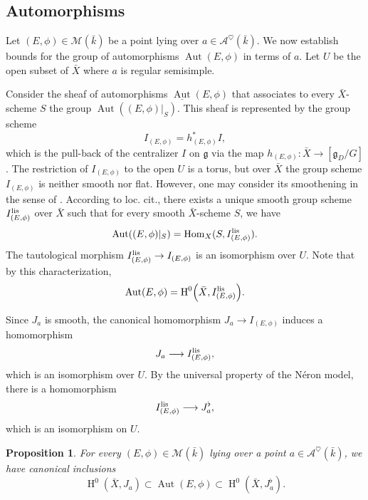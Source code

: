\documentclass[12pt,english]{smfart}
\numberwithin{equation}{subsection}
\newtheorem{proposition}[equation]{Proposition}
\theoremstyle{remark}
\begin{document}
\subsection{Automorphisms}\label{subsection : Automorphismes}

Let $(E,\phi)\in\mathcal{M}(\bar{k})$ be a point lying over $a\in\mathcal{A}^\heartsuit(\bar{k})$.
We now establish bounds for the group of automorphisms $\operatorname{Aut}(E,\phi)$ in terms of $a$.
Let $U$ be the open subset of $\bar X$ where $a$ is regular semisimple.

Consider the sheaf of automorphisms $\underline{\operatorname{Aut}}(E,\phi)$ that associates to every $\bar{X}$-scheme $S$
the group $\operatorname{Aut}((E,\phi)|_S)$. This sheaf is represented by the group scheme
$$
I_{(E,\phi)}=h_{(E,\phi)}^* I,
$$
which is the pull-back of the centralizer $I$ on $\mathfrak{g}$ via the map $h_{(E,\phi)}:\bar X\rightarrow [\mathfrak{g}_D/G]$.
The restriction of $I_{(E,\phi)}$ to the open $U$ is a torus, but over $\bar X$ the group scheme $I_{(E,\phi)}$
is neither smooth nor flat. However, one may consider its smoothening in the sense of \cite{BLR}. According to loc. cit.,
there exists a unique smooth group scheme $I_{(E,\phi)}^{\rm lis}$ over $\bar X$ such that for every smooth $\bar X$-scheme $S$, we have
$$
\operatorname{Aut}((E,\phi)|_S)=\operatorname{Hom}_X(S,I_{(E,\phi)}^{\rm lis}).
$$
The tautological morphism $I_{(E,\phi)}^{\rm lis}\rightarrow I_{(E,\phi)}$ is an isomorphism over $U$.
Note that by this characterization,
\begin{equation}
\operatorname{Aut}(E,\phi)=\operatorname{H}^0\Bigl(\bar X,I_{(E,\phi)}^{\rm lis}\Bigr).
\end{equation}

Since $J_a$ is smooth, the canonical homomorphism $J_a\rightarrow I_{(E,\phi)}$
induces a homomorphism
$$
J_a\longrightarrow I_{(E,\phi)}^{\rm lis},
$$
which is an isomorphism over $U$. By the universal property of the N\'eron model, there is a homomorphism
$$
I_{(E,\phi)}^{\rm lis}\longrightarrow J_a^\flat,
$$
which is an isomorphism on $U$.

\begin{proposition}\label{borne automorphisme}
For every $(E,\phi)\in\mathcal{M}(\bar{k})$ lying over a point $a\in\mathcal{A}^\heartsuit(\bar{k})$, we have canonical inclusions
$$
\operatorname{H}^0(\bar{X},J_a)\subset \operatorname{Aut}(E,\phi)\subset \operatorname{H}^0(\bar{X},J_a^\flat).
$$
\end{proposition}
\end{document}
